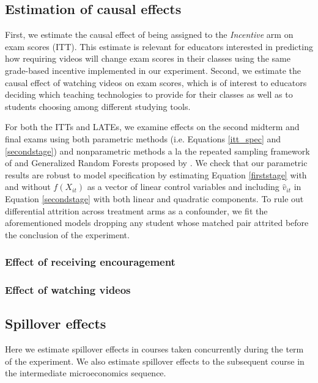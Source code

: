 \documentclass[12pt]{article}
\begin{document}
\subsection{Estimation of causal effects}

First, we estimate the causal effect of being assigned to the \textit{Incentive} arm on exam scores (ITT). This estimate is relevant for educators interested in predicting how requiring videos will change exam scores in their classes using the same grade-based incentive implemented in our experiment. Second, we estimate the causal effect of watching videos on exam scores, which is of interest to educators deciding which teaching technologies to provide for their classes as well as to students choosing among different studying tools.

For both the ITTs and LATEs, we examine effects on the second midterm and final exams using both parametric methods (i.e. Equations \ref{itt_spec} and \ref{secondstage}) and nonparametric methods a la the repeated sampling framework of \textcite{neyman1923} and Generalized Random Forests proposed by \textcite{wa2018}. We check that our parametric results are robust to model specification by estimating Equation \ref{firststage} with and without $f(X_{it})$ as a vector of linear control variables and including $\hat{v}_{it}$ in Equation \ref{secondstage} with both linear and quadratic components. To rule out differential attrition across treatment arms as a confounder, we fit the aforementioned models dropping any student whose matched pair attrited before the conclusion of the experiment.

\subsubsection{Effect of receiving encouragement}

\subsubsection{Effect of watching videos}


\subsection{Spillover effects}

Here we estimate spillover effects in courses taken concurrently during the term of the experiment. We also estimate spillover effects to the subsequent course in the intermediate microeconomics sequence.
\end{document}
